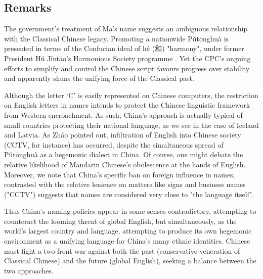 \subsection{Remarks}

The government's treatment of Ma's name suggests an ambiguous relationship with
the Classical Chinese legacy. Promoting a nationwide Pǔtōnghuà is presented in
terms of the Confucian ideal of hé ({\zafont 和}) "harmony", under former
President Hú Jǐntāo's Harmonious Society programme \parencite{wang16}. Yet the
CPC's ongoing efforts to simplify and control the Chinese script favours
progress over stability and apparently shuns the unifying force of the
Classical past.

Although the letter `C' is easily represented on Chinese computers, the
restriction on English letters in names intends to protect the Chinese
linguistic framework from Western encroachment. As such, China's approach is
actually typical of small countries protecting their national language, as we
see in the case of Iceland and Latvia. As Zháo pointed out, infiltration of
English into Chinese society (CCTV, for instance) has occurred, despite the
simultaneous spread of Pǔtōnghuà as a hegemonic dialect in China. Of course,
one might debate the relative likelihood of Mandarin Chinese's obolescence at
the hands of English. Moreover, we note that China's specific ban on foreign
influence in names, contrasted with the relative lenience on matters like signs
and business names ("CCTV") suggests that names are considered very close to
"the language itself".

Thus China's naming policies appear in some senses contradictory, attempting to
counteract the looming threat of global English, but simultaneously, as the
world's largest country and language, attempting to produce its own hegemonic
environment as a unifying language for China's many ethnic identities. Chinese
must fight a two-front war against both the past (conservative veneration of
Classical Chinese) and the future (global English), seeking a balance between
the two approaches.
